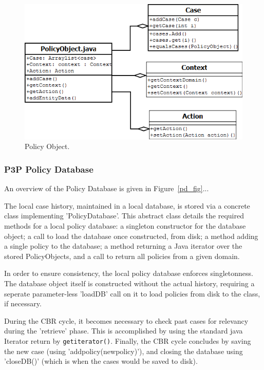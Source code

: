 \begin{figure}[htbp]
\begin{center}
\includegraphics[width = \textwidth]{DesignReport/uml/po.png}
\caption{Policy Object.}
\label{po_fig}
\end{center}
\end{figure}

\subsubsection{P3P Policy Database}

An overview of the Policy Database is given in Figure~\ref{pd_fig}...

The local case history, maintained in a local database, is stored via a concrete class implementing 'PolicyDatabase'. This abstract class details the required methods for a local policy database: a singleton constructor for the database object; a call to load the database once constructed, from disk; a method adding a single policy to the database; a method returning a Java iterator over the stored PolicyObjects, and a call to return all policies from a given domain.

In order to ensure consistency, the local policy database enforces singletonness. The database object itself is constructed without the actual history, requiring a seperate parameter-less 'loadDB' call on it to load policies from disk to the class, if necessary.

During the CBR cycle, it becomes necessary to check past cases for relevancy during the 'retrieve' phase. This is accomplished by using the standard java Iterator return by \texttt{getiterator()}.
Finally, the CBR cycle concludes by saving the new case (using 'addpolicy(newpolicy)'), and closing the database using 'closeDB()' (which is when the cases would be saved to disk).

